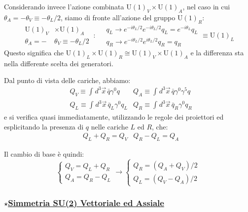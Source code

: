 \documentclass[../main.tex]{subfiles}
\begin{document}
Considerando invece l'azione combinata $\textrm{U}(1)_V\times \textrm{U}(1)_A$, nel caso in cui $\theta_A=-\theta_V \equiv -\theta_L/2$, siamo di fronte all'azione del gruppo $\textrm{U}(1)_R$:
\[
\boxed{
\begin{aligned}
    \textrm{U}(1)_V&\times \textrm{U}(1)_A \\
   \theta_A=-&\theta_V \equiv -\theta_L/2
\end{aligned}~:~
\begin{aligned}
    &q_L\rightarrow e^{-i\theta_L/2}e^{-i\theta_L/2}q_L = e^{-i\theta_L}q_L\\
    &q_R\rightarrow e^{-i\theta_L/2}e^{i\theta_L/2}q_R = q_R
\end{aligned}}\equiv \textrm{U}(1)_L
\]
Questo significa che $\textrm{U}(1)_L\times \textrm{U}(1)_R\cong \textrm{U}(1)_V\times \textrm{U}(1)_A$ e la differenza sta nella differente scelta dei generatori.

Dal punto di vista delle cariche, abbiamo:
\begin{align*}
    &Q_V \equiv \int_{}d^3\Vec{x}\,\bar q\gamma^0 q &Q_A \equiv \int_{}d^3\Vec{x}\,\bar q\gamma^0\gamma^5 q\\
    &Q_L \equiv \int_{}d^3\Vec{x}\,\bar q_L\gamma^0 q_L &Q_R \equiv \int_{}d^3\Vec{x}\,\bar q_R\gamma^0 q_R
\end{align*}
e si verifica quasi immediatamente, utilizzando le regole dei proiettori ed esplicitando la presenza di $q$ nelle cariche $L$ ed $R$, che:
\begin{align*}
    &Q_L+Q_R = Q_V    &Q_R-Q_L = Q_A
\end{align*}

Il cambio di base è quindi:
\begin{equation}
   \boxed{
    \begin{cases}
        Q_V = Q_L + Q_R\\
        Q_A = Q_R - Q_L
    \end{cases}\rightarrow
    \begin{cases}
        Q_R = (Q_A + Q_V)/2\\
        Q_L = (Q_V - Q_A)/2
    \end{cases}} 
    \label{eq:basis_change_VA_LR}
\end{equation}

\subsubsection{$\star$\underline{Simmetria SU(2) Vettoriale ed Assiale}}
\end{document}
